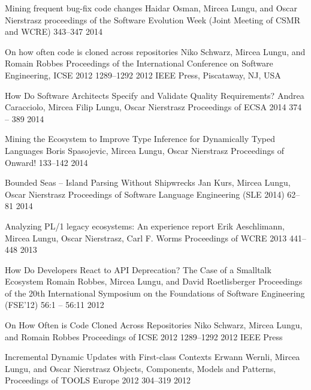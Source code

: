 \begin{enumerate}


\densepap
	{Mining frequent bug-fix code changes}
	{Haidar Osman, Mircea Lungu, and Oscar Nierstrasz}
	{proceedings of the Software Evolution Week (Joint Meeting of CSMR and WCRE)}
	{343--347}
	{2014}
	{}

\densepap 
	{On how often code is cloned across repositories}
	{Niko Schwarz, Mircea Lungu, and Romain Robbes}
	{Proceedings of the International Conference on Software Engineering, ICSE 2012}
	{1289--1292}
	{2012}
	{IEEE Press, Piscataway, NJ, USA}

\densepap
	{How Do Software Architects Specify and Validate Quality Requirements?}
	{Andrea Caracciolo, Mircea Filip Lungu, Oscar Nierstrasz}
	{Proceedings of ECSA 2014}
	{374 -- 389}
	{2014}
	{}

\densepap
	{Mining the Ecosystem to Improve Type Inference for Dynamically Typed Languages}
	{Boris Spasojevic, Mircea Lungu, Oscar Nierstrasz}
	{Proceedings of Onward!}
	{133--142}
	{2014}
	{}

\densepap
	{Bounded Seas -- Island Parsing Without Shipwrecks}
	{Jan Kurs, Mircea Lungu, Oscar Nierstrasz}
	{Proceedings of Software Language Engineering (SLE 2014)}
	{62--81}
	{2014}
	{}

\densepap
	{Analyzing PL/1 legacy ecosystems: An experience report}
	{Erik Aeschlimann, Mircea Lungu, Oscar Nierstrasz, Carl F. Worms}
	{Proceedings of WCRE 2013}
	{441--448}
	{2013}
	{}

\densepap
	{How Do Developers React to API Deprecation? The Case of a Smalltalk Ecosystem}
	{Romain Robbes, Mircea Lungu, and David Roetlisberger}
	{Proceedings of the 20th International Symposium on the Foundations of Software Engineering (FSE'12)}
	{56:1 -- 56:11}
	{2012}
	{}

\densepap
	{On How Often is Code Cloned Across Repositories}
	{Niko Schwarz, Mircea Lungu, and Romain Robbes}
	{Proceedings of ICSE 2012}
	{1289--1292}
	{2012}
	{IEEE Press}

\densepap
	{Incremental Dynamic Updates with First-class Contexts}
	{Erwann Wernli, Mircea Lungu, and Oscar Nierstrasz}
	{Objects, Components, Models and Patterns, Proceedings of TOOLS Europe 2012}
	{304--319}
	{2012}
	{}




\end{enumerate}
